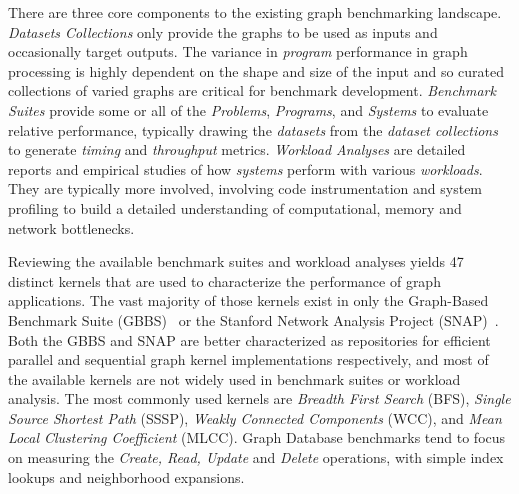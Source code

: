 There are three core components to the existing graph benchmarking landscape. 
\textit{Datasets Collections} only provide the graphs to be used as inputs and occasionally target outputs. 
The variance in \textit{program} performance in graph processing is highly dependent on the shape and size of the input and so curated collections of varied graphs are critical for benchmark development.
\textit{Benchmark Suites} provide some or all of the \textit{Problems}, \textit{Programs}, and \textit{Systems} to evaluate relative performance, typically drawing the \textit{datasets} from the \textit{dataset collections} to generate \textit{timing} and \textit{throughput} metrics.
\textit{Workload Analyses} are detailed reports and empirical studies of how \textit{systems} perform with various \textit{workloads}. 
They are typically more involved, involving code instrumentation and system profiling to build a detailed understanding of computational, memory and network bottlenecks. 

Reviewing the available benchmark suites and workload analyses yields 47 distinct kernels that are used to characterize the performance of graph applications.
The vast majority of those kernels exist in only the Graph-Based Benchmark Suite (GBBS)~\cite{Dhulipala2020, Dhulipala2021} or the Stanford Network Analysis Project (SNAP)~\cite{Leskovec2016}. 
Both the GBBS and SNAP are better characterized as repositories for efficient parallel and sequential graph kernel implementations respectively, and most of the available kernels are not widely used in benchmark suites or workload analysis. 
The most commonly used kernels are \textit{Breadth First Search} (BFS), \textit{Single Source Shortest Path} (SSSP), \textit{Weakly Connected Components} (WCC), and \textit{Mean Local Clustering Coefficient} (MLCC). 
Graph Database benchmarks tend to focus on measuring the \textit{Create, Read, Update} and \textit{Delete} operations, with simple index lookups and neighborhood expansions.



